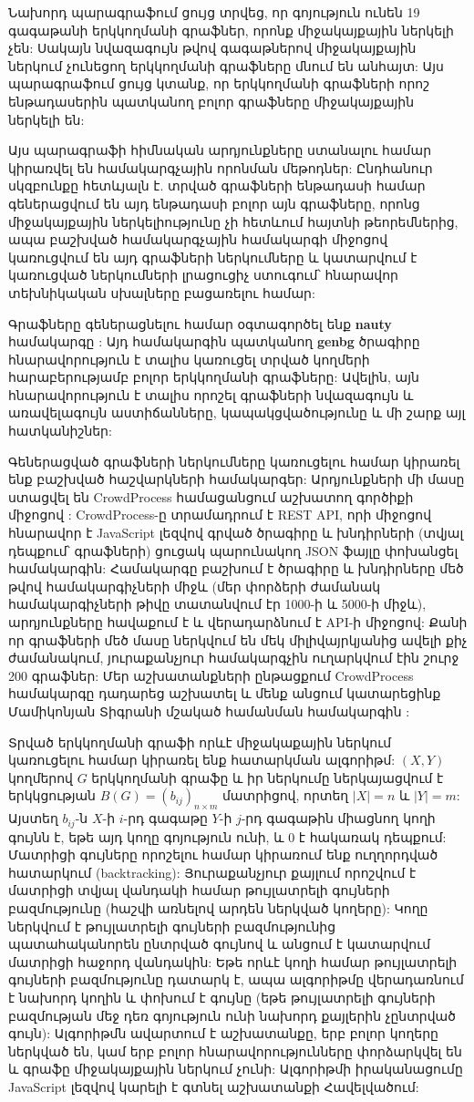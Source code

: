 Նախորդ պարագրաֆում ցույց տրվեց, որ գոյություն ունեն 19 գագաթանի երկկողմանի գրաֆներ, որոնք միջակայքային ներկելի չեն: Սակայն նվազագույն թվով գագաթներով միջակայքային ներկում չունեցող երկկողմանի գրաֆները մնում են անհայտ: Այս պարագրաֆում ցույց կտանք, որ երկկողմանի գրաֆների որոշ ենթադասերին պատկանող բոլոր գրաֆները միջակայքային ներկելի են: 

Այս պարագրաֆի հիմնական արդյունքները ստանալու համար կիրառվել են համակարգչային որոնման մեթոդներ: Ընդհանուր սկզբունքը հետևյալն է. տրված գրաֆների ենթադասի համար գեներացվում են այդ ենթադասի բոլոր այն գրաֆները, որոնց միջակայքային ներկելիությունը չի հետևում հայտնի թեորեմներից, ապա բաշխված համակարգչային համակարգի միջոցով կառուցվում են այդ գրաֆների ներկումները և կատարվում է կառուցված ներկումների լրացուցիչ ստուգում՝ հնարավոր տեխնիկական սխալները բացառելու համար:

Գրաֆները գեներացնելու համար օգտագործել ենք \textbf{nauty} համակարգը \cite{McKay}: Այդ համակարգին պատկանող \textbf{genbg} ծրագիրը հնարավորություն է տալիս կառուցել տրված կողմերի հարաբերությամբ բոլոր երկկողմանի գրաֆները: Ավելին, այն հնարավորություն է տալիս որոշել գրաֆների նվազագույն և առավելագույն աստիճանները, կապակցվածությունը և մի շարք այլ հատկանիշներ: 

Գեներացված գրաֆների ներկումները կառուցելու համար կիրառել ենք բաշխված հաշվարկների համակարգեր: Արդյունքների մի մասը ստացվել են CrowdProcess համացանցում աշխատող գործիքի միջոցով \cite{CrowdProcess}: CrowdProcess-ը տրամադրում է REST API, որի միջոցով հնարավոր է JavaScript լեզվով գրված ծրագիրը և խնդիրների (տվյալ դեպքում՝ գրաֆների) ցուցակ պարունակող JSON ֆայլը փոխանցել համակարգին: Համակարգը բաշխում է ծրագիրը և խնդիրները մեծ թվով համակարգիչների միջև (մեր փորձերի ժամանակ համակարգիչների թիվը տատանվում էր 1000-ի և 5000-ի միջև), արդյունքները հավաքում է և վերադարձնում է API-ի միջոցով: Քանի որ գրաֆների մեծ մասը ներկվում են մեկ միլիվայրկյանից ավելի քիչ ժամանակում, յուրաքանչյուր համակարգչին ուղարկվում էին շուրջ 200 գրաֆներ: Մեր աշխատանքների ընթացքում CrowdProcess համակարգը դադարեց աշխատել և մենք անցում կատարեցինք Մամիկոնյան Տիգրանի մշակած համանման համակարգին \cite{MamikonyanGithub}:

Տրված երկկողմանի գրաֆի որևէ միջակաքային ներկում կառուցելու համար կիրառել ենք հատարկման ալգորիթմ: $(X,Y)$ կողմերով $G$ երկկողմանի գրաֆը և իր ներկումը ներկայացվում է երկկցության $B(G) = (b_{ij})_{n \times m}$ մատրիցով, որտեղ $|X|=n$ և $|Y|=m$: Այստեղ $b_{ij}$-ն $X$-ի $i$-րդ գագաթը $Y$-ի $j$-րդ գագաթին միացնող կողի գույնն է, եթե այդ կողը գոյություն ունի, և $0$ է հակառակ դեպքում: Մատրիցի գույները որոշելու համար կիրառում ենք ուղղորդված հատարկում (backtracking): Յուրաքանչյուր քայլում որոշվում է մատրիցի տվյալ վանդակի համար թույլատրելի գույների բազմությունը (հաշվի առնելով արդեն ներկված կողերը): Կողը ներկվում է թույլատրելի գույների բազմությունից պատահականորեն ընտրված գույնով և անցում է կատարվում մատրիցի հաջորդ վանդակին: Եթե որևէ կողի համար թույլատրելի գույների բազմությունը դատարկ է, ապա ալգորիթմը վերադառնում է նախորդ կողին և փոխում է գույնը (եթե թույլատրելի գույների բազմության մեջ դեռ գոյություն ունի նախորդ քայլերին չընտրված գույն): Ալգորիթմն ավարտում է աշխատանքը, երբ բոլոր կողերը ներկված են, կամ երբ բոլոր հնարավորությունները փորձարկվել են և գրաֆը միջակայքային ներկում չունի: Ալգորիթմի իրականացումը JavaScript լեզվով կարելի է գտնել աշխատանքի Հավելվածում:

